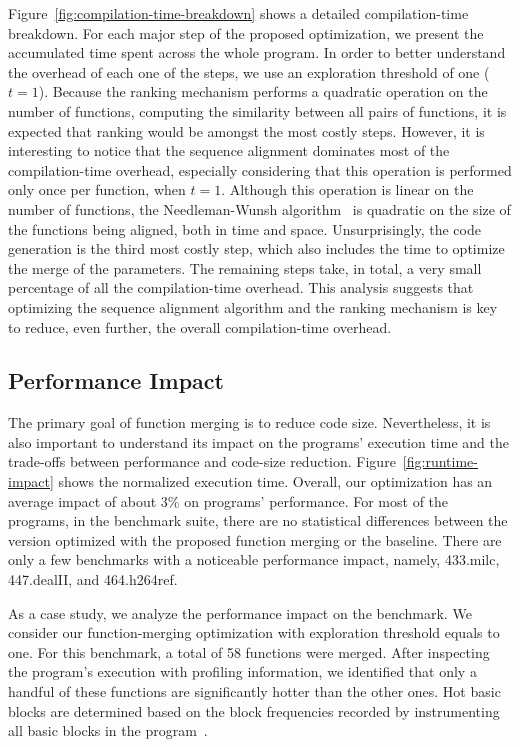 Figure~\ref{fig:compilation-time-breakdown} shows a detailed compilation-time
breakdown.
For each major step of the proposed optimization, we present the accumulated
time spent across the whole program.
In order to better understand the overhead of each one of the steps, we use
an exploration threshold of one ($t = 1$).
Because the ranking mechanism performs a quadratic operation on the number of
functions, computing the similarity between all pairs of functions, it is
expected that ranking would be amongst the most costly steps.
However, it is interesting to notice that the sequence alignment dominates most
of the compilation-time overhead, especially considering that this operation is
performed only once per function, when $t = 1$.
Although this operation is linear on the number of functions, the
Needleman-Wunsh algorithm~\cite{needleman70} is quadratic on the size of the
functions being aligned, both in time and space.
Unsurprisingly, the code generation is the third most costly step, which also
includes the time to optimize the merge of the parameters.
The remaining steps take, in total, a very small percentage of all the
compilation-time overhead.
This analysis suggests that optimizing the sequence alignment algorithm and
the ranking mechanism is key to reduce, even further, the overall
compilation-time overhead.

\vspace{-1ex}
\subsection{Performance Impact}


The primary goal of function merging is to reduce code size.
Nevertheless, it is also important to understand its impact on the programs'
execution time and the trade-offs between performance and code-size reduction.
Figure~\ref{fig:runtime-impact} shows the normalized execution time.
Overall, our optimization has an average impact of about 3\% on programs' performance.
For most of the programs, in the benchmark suite, there are no
statistical differences between the version optimized with the proposed function
merging or the baseline.
There are only a few benchmarks with a noticeable performance impact, namely,
433.milc, 447.dealII, and 464.h264ref.

As a case study, we analyze the performance impact on the 
benchmark.
We consider our function-merging optimization with exploration threshold equals
to one.
For this benchmark, a total of 58 functions were merged.
After inspecting the program's execution with profiling information, we
identified that only a handful of these functions are significantly hotter than
the other ones.
Hot basic blocks are determined based on the block frequencies recorded by
instrumenting all basic blocks in the program~\cite{ball94}.

